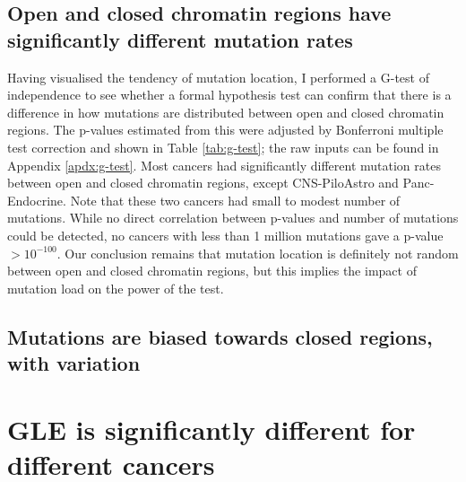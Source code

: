 

\subsection{Open and closed chromatin regions have significantly different mutation rates}
Having visualised the tendency of mutation location, I performed a G-test of independence to see whether a formal hypothesis test can confirm that there is a difference in how mutations are distributed between open and closed chromatin regions. The p-values estimated from this were adjusted by Bonferroni multiple test correction and shown in Table \ref{tab:g-test}; the raw inputs can be found in Appendix \ref{apdx:g-test}. Most cancers had significantly different mutation rates between open and closed chromatin regions, except CNS-PiloAstro and Panc-Endocrine. Note that these two cancers had small to modest number of mutations. While no direct correlation between p-values and number of mutations could be detected, no cancers with less than 1 million mutations gave a p-value $>10^{-100}$. Our conclusion remains that mutation location is definitely not random between open and closed chromatin regions, but this implies the impact of mutation load on the power of the test.



\subsection{Mutations are biased towards closed regions, with variation}



\section{GLE is significantly different for different cancers}